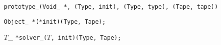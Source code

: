 
\tt{prototype_(Void_ *, (Type, init), (Type, type), (Tape, tape))}


\tt{Object_ *(*init)(Type, Tape);}


$T$\_ \tt{*solver_(}$T$\tt{, init)(Type, Tape);}
